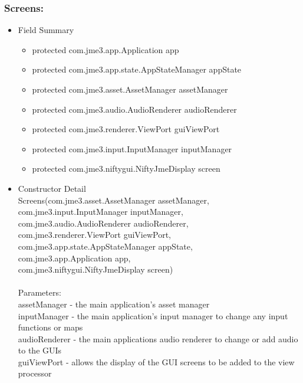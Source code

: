 \documentclass[letterpaper]{article}
\begin{document}
						\subsubsection*{Screens:}
						\vspace{0.1in}	
							\begin{itemize}
								\item	Field Summary
										\begin{itemize}
											\item	protected com.jme3.app.Application	app 
											\item	protected com.jme3.app.state.AppStateManager	appState 
											\item	protected com.jme3.asset.AssetManager	assetManager 
											\item	protected com.jme3.audio.AudioRenderer	audioRenderer 
											\item	protected com.jme3.renderer.ViewPort	guiViewPort 
											\item	protected com.jme3.input.InputManager	inputManager 
											\item	protected com.jme3.niftygui.NiftyJmeDisplay	screen
										\end{itemize}
								\item	Constructor Detail \\
										Screens(com.jme3.asset.AssetManager assetManager, \\
		      com.jme3.input.InputManager inputManager, \\
		      com.jme3.audio.AudioRenderer audioRenderer, \\
		      com.jme3.renderer.ViewPort guiViewPort, \\
		      com.jme3.app.state.AppStateManager appState, \\
		      com.jme3.app.Application app, \\
		      com.jme3.niftygui.NiftyJmeDisplay screen) \\ \\
										Parameters: \\
										assetManager - the main application's asset manager \\
										inputManager - the main application's input manager to change any input functions or maps \\
										audioRenderer - the main applications audio renderer to change or add audio to the GUIs \\
										guiViewPort - allows the display of the GUI screens to be added to the view processor \\

\end{itemize}
\end{document}
